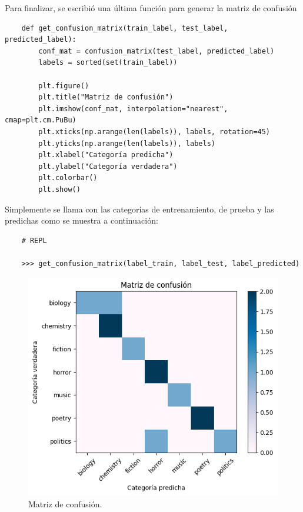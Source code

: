 Para finalizar, se escribió una última función para generar la matriz de confusión
\begin{verbatim}
    def get_confusion_matrix(train_label, test_label, predicted_label):
        conf_mat = confusion_matrix(test_label, predicted_label)
        labels = sorted(set(train_label))

        plt.figure()
        plt.title("Matriz de confusión")
        plt.imshow(conf_mat, interpolation="nearest", cmap=plt.cm.PuBu)
        plt.xticks(np.arange(len(labels)), labels, rotation=45)
        plt.yticks(np.arange(len(labels)), labels)
        plt.xlabel("Categoría predicha")
        plt.ylabel("Categoría verdadera")
        plt.colorbar()
        plt.show()
\end{verbatim}

Simplemente se llama con las categorías de entrenamiento, de prueba y las predichas como se muestra a continuación:
\begin{verbatim}
    # REPL

    >>> get_confusion_matrix(label_train, label_test, label_predicted)
\end{verbatim}

\begin{figure}[ht!]
    \centering
    \includegraphics[scale=0.8]{../figures/confusion_matrix.png}
    \caption{Matriz de confusión.}
    \label{fig:confusion_matrix}
\end{figure}

